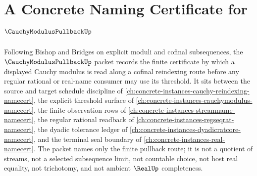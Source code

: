 \chapter{A Concrete Naming Certificate for $\CauchyModulusPullbackUp$}
\label{ch:concrete-instances-cauchy-modulus-pullback-namecert}

Following Bishop and Bridges on explicit moduli and cofinal subsequences, the $\CauchyModulusPullbackUp$ packet records the finite certificate by which a displayed Cauchy modulus is read along a cofinal reindexing route before any regular rational or real-name consumer may use its threshold. It sits between the source and target schedule discipline of \autoref{ch:concrete-instances-cauchy-reindexing-namecert}, the explicit threshold surface of \autoref{ch:concrete-instances-cauchymodulus-namecert}, the finite observation rows of \autoref{ch:concrete-instances-streamname-namecert}, the regular rational readback of \autoref{ch:concrete-instances-regseqrat-namecert}, the dyadic tolerance ledger of \autoref{ch:concrete-instances-dyadicratcore-namecert}, and the terminal seal boundary of \autoref{ch:concrete-instances-real-namecert}. The packet names only the finite pullback route; it is not a quotient of streams, not a selected subsequence limit, not countable choice, not host real equality, not trichotomy, and not ambient $\RealUp$ completeness.

